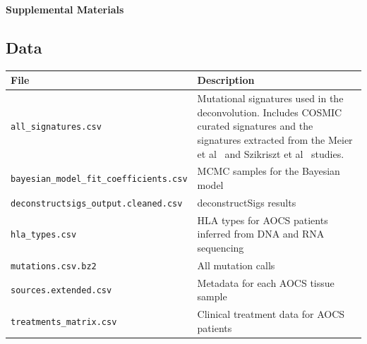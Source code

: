 
\pagebreak
\begin{center}
\textbf{\large Supplemental Materials}
\end{center}

\setcounter{equation}{0}
\setcounter{figure}{0}
\setcounter{table}{0}
\makeatletter
\renewcommand{\theequation}{S\arabic{equation}}
\renewcommand{\thefigure}{S\arabic{figure}}

\subsection*{Data}
\begin{center}
    \begin{tabular}{ | l | p{5cm} |}
    \hline
    File & Description \\ \hline
    \texttt{all_signatures.csv} & Mutational signatures used in the deconvolution. Includes COSMIC curated signatures and the signatures extracted from the Meier et al~\cite{Meier_2014} and Szikriszt et al~\cite{Szikriszt_2016} studies. \\
    \texttt{bayesian_model_fit_coefficients.csv} & MCMC samples for the Bayesian model \\
    \texttt{deconstructsigs_output.cleaned.csv} & deconstructSigs results \\
    \texttt{hla_types.csv} & HLA types for AOCS patients inferred from DNA and RNA sequencing \\
    \texttt{mutations.csv.bz2} & All mutation calls \\
    \texttt{sources.extended.csv} & Metadata for each AOCS tissue sample \\
    \texttt{treatments_matrix.csv} & Clinical treatment data for AOCS patients \\
    \hline
    \end{tabular}
\end{center}

